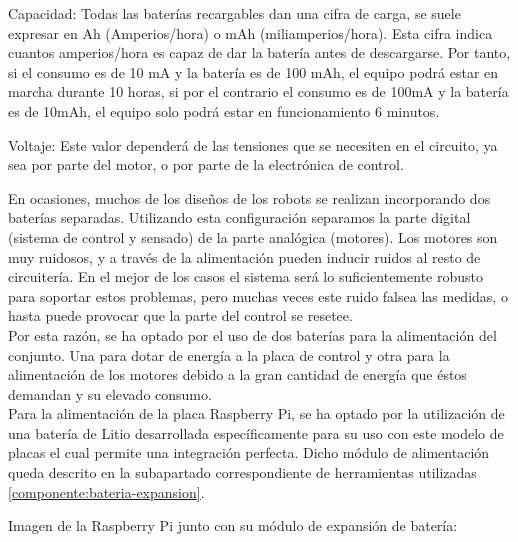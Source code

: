 Capacidad: Todas las baterías recargables dan una cifra de carga, se suele
expresar en Ah (Amperios/hora) o mAh (miliamperios/hora). Esta cifra indica
cuantos amperios/hora es capaz de dar la batería antes de descargarse. Por tanto,
si el consumo es de 10 mA y la batería es de 100 mAh, el equipo podrá estar en
marcha durante 10 horas, si por el contrario el consumo es de 100mA y la batería
es de 10mAh, el equipo solo podrá estar en funcionamiento 6 minutos.

Voltaje: Este valor dependerá de las tensiones que se necesiten en el circuito, ya
sea por parte del motor, o por parte de la electrónica de control.

En ocasiones, muchos de los diseños de los robots se realizan incorporando dos baterías separadas. Utilizando esta configuración separamos la
parte digital (sistema de control y sensado) de la parte analógica (motores). Los motores son muy ruidosos, y a través de la alimentación pueden inducir ruidos
al resto de circuitería. En el mejor de los casos el sistema será lo suficientemente robusto para soportar estos problemas, pero muchas
veces este ruido falsea las medidas, o hasta puede provocar que la parte del control se resetee.\\

Por esta razón, se ha optado por el uso de dos baterías para la alimentación del conjunto. Una para dotar de energía a la placa de control y otra para la alimentación de los 
motores debido a la gran cantidad de energía que éstos demandan y su elevado consumo.\\

Para la alimentación de la placa Raspberry Pi, se ha optado por la utilización de una batería de Litio desarrollada específicamente para su uso con este modelo de placas el cual permite una integración
perfecta. Dicho módulo de alimentación queda descrito en la subapartado correspondiente de herramientas utilizadas \ref{componente:bateria-expansion}.

Imagen de la Raspberry Pi junto con su módulo de expansión de batería:

